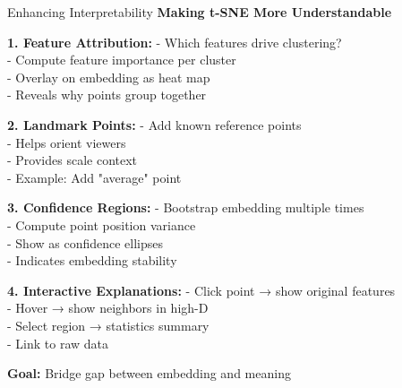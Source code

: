 \documentclass[10pt]{beamer}
\newcommand{\emphtext}[1]{\textcolor{upcblue}{\textbf{#1}}}
\newcommand{\warningbox}[1]{\colorbox{red!10}{\begin{minipage}{0.85\textwidth}\centering #1\end{minipage}}}
\begin{document}
\begin{frame}{Enhancing Interpretability}
\emphtext{Making t-SNE More Understandable}

\vspace{0.3cm}
\textbf{1. Feature Attribution:}
\footnotesize
- Which features drive clustering?\\
- Compute feature importance per cluster\\
- Overlay on embedding as heat map\\
- Reveals why points group together

\vspace{0.2cm}
\textbf{2. Landmark Points:}
\footnotesize
- Add known reference points\\
- Helps orient viewers\\
- Provides scale context\\
- Example: Add "average" point

\vspace{0.2cm}
\textbf{3. Confidence Regions:}
\footnotesize
- Bootstrap embedding multiple times\\
- Compute point position variance\\
- Show as confidence ellipses\\
- Indicates embedding stability

\vspace{0.2cm}
\textbf{4. Interactive Explanations:}
\footnotesize
- Click point → show original features\\
- Hover → show neighbors in high-D\\
- Select region → statistics summary\\
- Link to raw data

\begin{center}
\warningbox{\footnotesize\textbf{Goal:} Bridge gap between embedding and meaning}
\end{center}
\end{frame}
\end{document}
